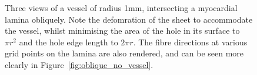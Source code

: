     \begin{figure}[htbp]
      \centering
      \vspace{-2.5em}
      \caption{Three views of a vessel of radius 1mm, intersecting a myocardial lamina obliquely. Note the defomration of the sheet to accommodate the vessel, whilst minimising the area of the hole in its surface to $\pi r^2$ and the hole edge length to $2\pi r$. The fibre directions at various grid points on the lamina are also rendered, and can be seen more clearly in Figure~\ref{fig:oblique_no_vessel}.}
      \label{fig:oblique_vessel}
    \end{figure}

